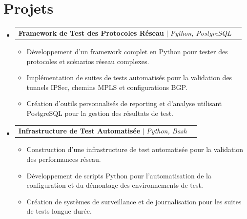 \documentclass[letterpaper,10pt]{article}
\makeatletter
\newcommand{\resumeItem}[1]{
  \item\small{
    {#1 \vspace{-2pt}}
  }
}
\newcommand{\resumeProjectHeading}[2]{
    \vspace{-2pt}\item
    \begin{tabular*}{0.97\textwidth}{l@{\extracolsep{\fill}}r}
      \small#1 & #2 \\
    \end{tabular*}\vspace{-7pt}
}
\newcommand{\resumeSubHeadingListStart}{\begin{itemize}[leftmargin=0.15in, label={}]}
\newcommand{\resumeSubHeadingListEnd}{\end{itemize}}
\newcommand{\resumeItemListStart}{\begin{itemize}}
\newcommand{\resumeItemListEnd}{\end{itemize}\vspace{-5pt}}
\makeatother
\begin{document}
\section{Projets}
    \vspace{3pt}
    \resumeSubHeadingListStart

      \resumeProjectHeading
        {\textbf{Framework de Test des Protocoles Réseau} $|$ \emph{Python, PostgreSQL}}{}
          \resumeItemListStart
            \resumeItem{
              Développement d'un framework complet en Python pour tester des protocoles et scénarios réseau complexes.
            }
            \resumeItem{
              Implémentation de suites de tests automatisés pour la validation des tunnels IPSec, chemins MPLS et configurations BGP.
            }
            \resumeItem{
              Création d'outils personnalisés de reporting et d'analyse utilisant PostgreSQL pour la gestion des résultats de test.
            }
          \resumeItemListEnd

      \resumeProjectHeading
        {\textbf{Infrastructure de Test Automatisée} $|$ \emph{Python, Bash}}{}
          \resumeItemListStart
            \resumeItem{
              Construction d'une infrastructure de test automatisée pour la validation des performances réseau.
            }
            \resumeItem{
              Développement de scripts Python pour l'automatisation de la configuration et du démontage des environnements de test.
            }
            \resumeItem{
              Création de systèmes de surveillance et de journalisation pour les suites de tests longue durée.
            }
          \resumeItemListEnd

    \resumeSubHeadingListEnd
\end{document}
